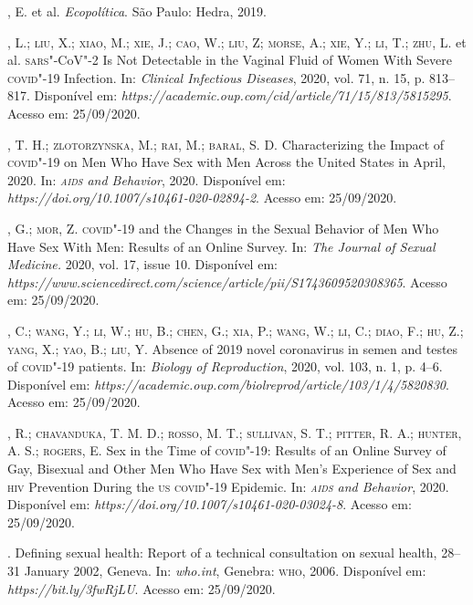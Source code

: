 \begin{bibliohedra}
, E. et al. \emph{Ecopolítica}. São Paulo: Hedra, 2019.

, L.; \textsc{liu}, X.; \textsc{xiao}, M.; \textsc{xie}, J.; \textsc{cao}, W.; \textsc{liu}, Z; \textsc{morse}, A.; \textsc{xie},
Y.; \textsc{li}, T.; \textsc{zhu}, L. et al. \textsc{sars}"-CoV"-2 Is Not Detectable in the Vaginal
Fluid of Women With Severe \textsc{covid}"-19 Infection. In: \emph{Clinical
Infectious Diseases}, 2020, vol. 71, n. 15, p. 813--817. Disponível em:
\emph{https://academic.oup.com/cid/article/71/15/813/5815295}. Acesso em:
25/09/2020.

, T. H.; \textsc{zlotorzynska}, M.; \textsc{rai}, M.; \textsc{baral}, S. D. Characterizing
the Impact of \textsc{covid}"-19 on Men Who Have Sex with Men Across the United
States in April, 2020. In: \emph{\textsc{aids} and Behavior}, 2020. Disponível
em: \emph{https://doi.org/10.1007/s10461-020-02894-2}. Acesso em:
25/09/2020.

, G.; \textsc{mor}, Z. \textsc{covid}"-19 and the Changes in the Sexual Behavior of
Men Who Have Sex With Men: Results of an Online Survey. In: \emph{The
Journal of Sexual Medicine.} 2020, vol. 17, issue 10. Disponível em:
\emph{https://www.sciencedirect.com/science/article/pii/S1743609520308365}.
Acesso em: 25/09/2020.

, C.; \textsc{wang}, Y.; \textsc{li}, W.; \textsc{hu}, B.; \textsc{chen}, G.; \textsc{xia}, P.; \textsc{wang}, W.; \textsc{li}, C.;
\textsc{diao}, F.; \textsc{hu}, Z.; \textsc{yang}, X.; \textsc{yao}, B.; \textsc{liu}, Y. Absence of 2019 novel
coronavirus in semen and testes of \textsc{covid}"-19 patients. In: \emph{Biology
of Reproduction}, 2020, vol. 103, n. 1, p. 4--6. Disponível em:
\emph{https://academic.oup.com/biolreprod/article/103/1/4/5820830}.
Acesso em: 25/09/2020.

, R.; \textsc{chavanduka}, T. M. D.; \textsc{rosso}, M. T.; \textsc{sullivan}, S. T.;
\textsc{pitter}, R. A.; \textsc{hunter}, A. S.; \textsc{rogers}, E. Sex in the Time of \textsc{covid}"-19:
Results of an Online Survey of Gay, Bisexual and Other Men Who Have Sex
with Men's Experience of Sex and \textsc{hiv} Prevention During the \textsc{us} \textsc{covid}"-19
Epidemic. In: \emph{\textsc{aids} and Behavior}, 2020. Disponível em:
\emph{https://doi.org/10.1007/s10461-020-03024-8}. Acesso em: 25/09/2020.

. Defining sexual health: Report of a technical consultation on
sexual health, 28--31 January 2002, Geneva. In: \emph{who.int}, Genebra:
\textsc{who}, 2006. Disponível em: \emph{https://bit.ly/3fwRjLU}. Acesso em: 25/09/2020.
\end{bibliohedra}

